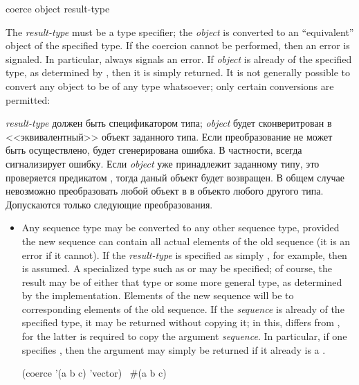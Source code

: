 \begin{defun}[Function]
coerce object result-type

The \emph{result-type} must be a type specifier; the \emph{object} is converted
to an ``equivalent'' object of the specified type.
If the coercion cannot be performed, then an error is signaled.
In particular,  always signals an error.
If \emph{object} is already of the specified type, as determined
by , then it is simply returned.
It is not generally
possible to convert any object to be of any type whatsoever; only certain
conversions are permitted:

\emph{result-type} должен быть спецификатором типа; \emph{object} будет
сконверитрован в <<эквивалентный>> объект заданного типа.
Если преобразование не может быть осуществлено, будет сгенерирована ошибка.
В частности,  всегда сигнализирует ошибку.
Если \emph{object} уже принадлежит заданному типу, это проверяется предикатом
, тогда даный объект будет возвращен.
В общем случае невозможно преобразовать любой объект в в объекто любого другого
типа. Допускаются только следующие преобразования.
\begin{itemize}
\item
Any sequence type may be converted to any other sequence type, provided
the new sequence can contain all actual elements of the old sequence
(it is an error if it cannot).  If the \emph{result-type} is specified as
simply , for example, then  is assumed.  A
specialized type such as  or 
may be specified; of course, the result may be of either that type or
some more general type, as determined by the implementation.
Elements of the new sequence will be  to corresponding elements
of the old sequence.
If the
\emph{sequence} is already of the specified type, it may be returned without
copying it; in this,  differs from
, for the latter is required to
copy the argument \emph{sequence}.  In particular, if one specifies
, then the argument may simply be returned if it already is
a .
\begin{lisp}
(coerce '(a b c) 'vector) \EV\ \#(a b c)
\end{lisp}


\end{itemize}
\end{defun}
